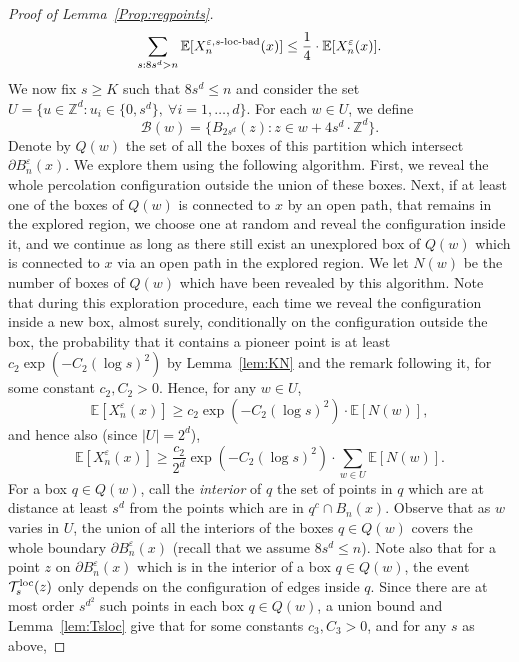 \documentclass[11pt,a4paper]{article}
\numberwithin{equation}{section}
\theoremstyle{plain}
\theoremstyle{definition}
\begin{document}
\begin{proof}[Proof of Lemma~\textup{\ref{Prop:regpoints}}]
\begin{equation}\label{eq:Xns2}
\sum_{s:8s^d>n} \mathbb E[X_n^{\varepsilon, s\textup{-loc-bad}}(x)]\le \frac 14 \cdot \mathbb E[X_n^\varepsilon(x)]. 
\end{equation}
We now fix $s\ge K$ such that $8s^d\le n$ and consider the set $U = \{ u \in \mathbb Z^d : u_i \in \{0,s^d\}, \ \forall i =1,\dots,d\}$. For each $w\in U$, we define 
\begin{equation}
\mathcal B(w) = \{B_{2s^d}(z) : z\in w+4s^d\cdot \mathbb Z^d\}.
\end{equation} 
Denote by $Q(w)$ the set of all the boxes of this partition which intersect $\partial B_n^\varepsilon(x)$.
We explore them using the following algorithm. First, we reveal the whole percolation configuration outside the union of these boxes. 
Next, if at least one of the boxes of $Q(w)$ is connected to $x$ by an open path, that remains in the explored region, we choose one at random and 
reveal the configuration inside it, and we continue as long as there still exist an unexplored box of $Q(w)$ which is connected to $x$ via an open path in the explored region.  
We let $N(w)$ be the number of boxes of $Q(w)$ which have been revealed by this algorithm. Note that during this exploration procedure, each time we reveal the configuration inside a 
new box, almost surely, conditionally on the configuration outside the box, the probability that it contains a pioneer point is at least $c_2\exp(-C_2 (\log s)^2)$ by Lemma~\ref{lem:KN} and the remark following it, for some constant $c_2,C_2>0$. Hence, for any $w\in U$, 
\begin{equation}
\mathbb E[X_n^\varepsilon(x)] \ge c_2\exp(-C_2(\log s)^2) \cdot \mathbb E[N(w)], 
\end{equation} 
and hence also (since $|U|=2^d$), 
\begin{equation}\label{eq:Xneps}
\mathbb E[X_n^\varepsilon(x)] \ge \frac{c_2}{2^d} \exp(-C_2(\log s)^2) \cdot \sum_{w\in U} \mathbb E[N(w)]. 
\end{equation}
For a box $q\in Q(w)$, call the \emph{interior} of $q$ the set of points in $q$ which are at distance at least $s^d$ from the points which are in $q^c\cap B_n(x)$. Observe that as $w$ varies in $U$, the union of all the interiors of the boxes $q\in Q(w)$ covers the whole boundary $\partial B_n^\varepsilon(x)$ (recall that we assume $8s^d\le n$).   
Note also that for a point $z$ on $\partial B_n^\varepsilon(x)$ which is in the interior of a box $q\in Q(w)$, the event $\mathcal T_s^{\textup{loc}}(z)$ only depends on the configuration of edges inside $q$. Since there are at most order $s^{d^2}$ such points in each box $q\in Q(w)$, a union bound and Lemma~\ref{lem:Tsloc} give that for some constants $c_3,C_3>0$, and for any $s$ as above,

\end{proof}
\end{document}
